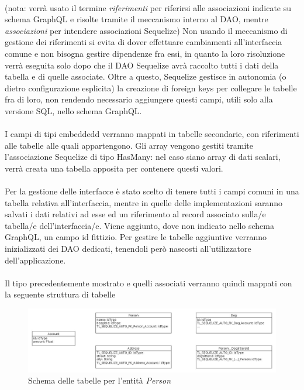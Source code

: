 \documentclass[a4paper, 12pt]{report}
\begin{document}
      \paragraph*{}
      (nota: verrà usato il termine \emph{riferimenti} per riferirsi alle associazioni indicate su schema GraphQL e risolte tramite il meccanismo interno al DAO, mentre \emph{associazioni} per intendere associazioni Sequelize)
      Non usando il meccanismo di gestione dei riferimenti si evita di dover effettuare cambiamenti all'interfaccia comune e non bisogna gestire dipendenze fra essi, in quanto la loro risoluzione verrà eseguita solo dopo che il DAO Sequelize avrà raccolto tutti i dati della tabella e di quelle associate.
      Oltre a questo, Sequelize gestisce in autonomia (o dietro configurazione esplicita) la creazione di foreign keys per collegare le tabelle fra di loro, non rendendo necessario aggiungere questi campi, utili solo alla versione SQL, nello schema GraphQL.
      \paragraph*{}
      I campi di tipi embeddedd verranno mappati in tabelle secondarie, con riferimenti alle tabelle alle quali appartengono.
      Gli array vengono gestiti tramite l'associazione Sequelize di tipo HasMany: nel caso siano array di dati scalari, verrà creata una tabella apposita per contenere questi valori.
      \paragraph*{}
      Per la gestione delle interfacce è stato scelto di tenere tutti i campi comuni in una tabella relativa all'interfaccia, mentre in quelle delle implementazioni saranno salvati i dati relativi ad esse ed un riferimento al record associato sulla/e tabella/e dell'interfaccia/e.
      Viene aggiunto, dove non indicato nello schema GraphQL, un campo id fittizio.
      Per gestire le tabelle aggiuntive verranno inizializzati dei DAO dedicati, tenendoli però nascosti all'utilizzatore dell'applicazione.
      \paragraph*{}
      Il tipo precedentemente mostrato e quelli associati verranno quindi mappati con la seguente struttura di tabelle
      \begin{figure}[H]
        \includegraphics[width=\textwidth]{db-example.jpg}
        \caption{Schema delle tabelle per l'entità \emph{Person}}
      \end{figure}
\end{document}
